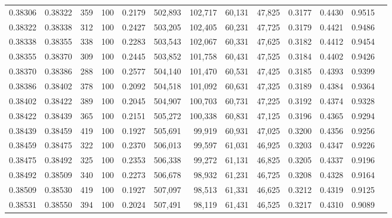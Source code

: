 \begin{tabular}{rrrrrrrrrrrrr}
0.38306 & 0.38322 &   359 & 100 &                                     0.2179 & 502,893 & 102,717 &  60,131 &  47,825 & 0.3177 & 0.4430 & 0.9515 \\
0.38322 & 0.38338 &   312 & 100 &                                     0.2427 & 503,205 & 102,405 &  60,231 &  47,725 & 0.3179 & 0.4421 & 0.9486 \\
0.38338 & 0.38355 &   338 & 100 &                                     0.2283 & 503,543 & 102,067 &  60,331 &  47,625 & 0.3182 & 0.4412 & 0.9454 \\
0.38355 & 0.38370 &   309 & 100 &                                     0.2445 & 503,852 & 101,758 &  60,431 &  47,525 & 0.3184 & 0.4402 & 0.9426 \\
0.38370 & 0.38386 &   288 & 100 &                                     0.2577 & 504,140 & 101,470 &  60,531 &  47,425 & 0.3185 & 0.4393 & 0.9399 \\
0.38386 & 0.38402 &   378 & 100 &                                     0.2092 & 504,518 & 101,092 &  60,631 &  47,325 & 0.3189 & 0.4384 & 0.9364 \\
0.38402 & 0.38422 &   389 & 100 &                                     0.2045 & 504,907 & 100,703 &  60,731 &  47,225 & 0.3192 & 0.4374 & 0.9328 \\
0.38422 & 0.38439 &   365 & 100 &                                     0.2151 & 505,272 & 100,338 &  60,831 &  47,125 & 0.3196 & 0.4365 & 0.9294 \\
0.38439 & 0.38459 &   419 & 100 &                                     0.1927 & 505,691 &  99,919 &  60,931 &  47,025 & 0.3200 & 0.4356 & 0.9256 \\
0.38459 & 0.38475 &   322 & 100 &                                     0.2370 & 506,013 &  99,597 &  61,031 &  46,925 & 0.3203 & 0.4347 & 0.9226 \\
0.38475 & 0.38492 &   325 & 100 &                                     0.2353 & 506,338 &  99,272 &  61,131 &  46,825 & 0.3205 & 0.4337 & 0.9196 \\
0.38492 & 0.38509 &   340 & 100 &                                     0.2273 & 506,678 &  98,932 &  61,231 &  46,725 & 0.3208 & 0.4328 & 0.9164 \\
0.38509 & 0.38530 &   419 & 100 &                                     0.1927 & 507,097 &  98,513 &  61,331 &  46,625 & 0.3212 & 0.4319 & 0.9125 \\
0.38531 & 0.38550 &   394 & 100 &                                     0.2024 & 507,491 &  98,119 &  61,431 &  46,525 & 0.3217 & 0.4310 & 0.9089 \\

\end{tabular}
